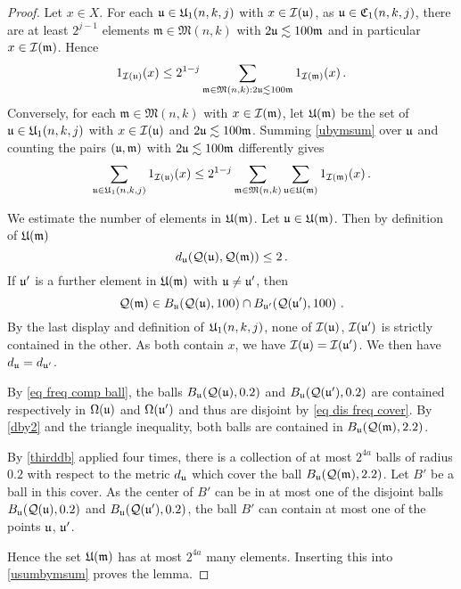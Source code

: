 
\begin{proof}
Let $x\in X$. For each
$\fu\in \fU_1(n,k,j)$ with $x\in \sc(\fu)$, as $\fu \in \fC_1(n,k,j)$,
there are at least $2^{j-1}$  elements $\mathfrak{m}\in \mathfrak{M}(n,k)$
with $2\fu \lesssim 100\mathfrak{m}$ and in particular
$x\in \sc(\mathfrak{m})$. Hence
\begin{equation}\label{ubymsum}
     1_{\sc(\fu)}(x)
    \le 2^{1-j}\sum_{\mathfrak{m} \in \mathfrak{M}(n,k): 2\fu\lesssim 100 \mathfrak{m}} 1_{\sc(\mathfrak{m})}(x)\, .
\end{equation}
Conversely, for each $\mathfrak{m}\in \mathfrak{M}(n,k)$
with $x\in \sc(\mathfrak{m})$,
let $\fU(\mathfrak{m})$ be the set of
$\fu\in \fU_1(n,k,j)$ with $x\in \sc(\fu)$
and $2\fu \lesssim 100\mathfrak{m}$.
Summing \eqref{ubymsum} over $\fu$ and counting the pairs
$(\fu,\mathfrak{m})$ with $2\fu \lesssim 100\mathfrak{m}$
differently gives
\begin{equation}\label{usumbymsum}
     \sum_{\fu\in \fU_1(n,k,j)} 1_{\sc(\fu)}(x)
    \le 2^{1-j}\sum_{\mathfrak{m} \in \mathfrak{M}(n,k)}
    \sum_{\fu \in \fU(\mathfrak{m})} 1_{\sc(\mathfrak{m})}(x)\, .
\end{equation}



We estimate the number of elements in $\fU(\mathfrak{m})$.
Let $\fu  \in \fU(\mathfrak{m})$.
Then by definition of
$\fU(\mathfrak{m})$
\begin{equation}\label{dby2}
     d_{\fu}(\fcc(\fu),\fcc(\mathfrak{m}))\le 2\, .
\end{equation}
If $\fu'$ is a further element in $\fU(\mathfrak{m})$ with $\fu\neq \fu'$, then
\begin{equation}
    \fcc(\mathfrak{m})
    \in B_{\fu}(\fcc(\fu),100)\cap B_{\fu'}(\fcc(\fu'),100)\ .
\end{equation}
By the last display and definition of $\fU_1(n,k,j)$, none of $\sc(\fu)$, $\sc(\fu')$ is strictly contained in the other. As both contain $x$, we have $\sc(\fu)=\sc(\fu')$.
We then have $d_{\fu}=d_{\fu'}$.

By \eqref{eq freq comp ball}, the balls
$B_{\fu}(\fcc(\fu),0.2)$ and
$B_{\fu}(\fcc(\fu'),0.2)$ are
contained respectively in $\fc(\fu)$
and $\fc(\fu')$ and thus are disjoint by \eqref{eq dis freq cover}.
By \eqref{dby2} and the triangle inequality, both balls are contained in $B_{\fu}(\fcc(\mathfrak{m}), 2.2)$.

By \eqref{thirddb} applied four times, there is a collection of at most
$2^{4a}$ balls of radius $0.2$ with respect to the metric $d_{\fu}$ which cover the ball $B_{\fu}(\fcc(\mathfrak{m}),2.2)$.
Let $B'$ be a ball in this cover.
As the center of $B'$  can be in at most one of the disjoint balls
$B_{\fu}(\fcc(\fu),0.2)$ and
$B_{\fu}(\fcc(\fu'),0.2)$,
the ball $B'$ can contain at most
one of the points $\fu$, $\fu'$.

Hence the set $\fU(\mathfrak{m})$ has at most
$2^{4a}$ many elements.
Inserting this into \eqref{usumbymsum} proves the lemma.
\end{proof}

